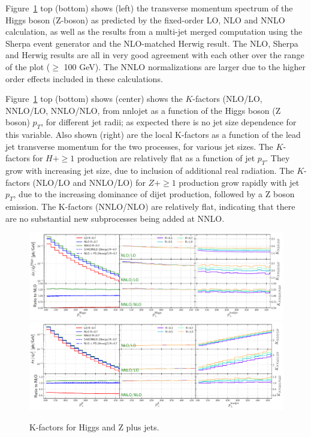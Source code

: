\documentclass[aps,prd,onecolumn,fleqn,superscriptaddress,groupedaddress,nofootinbib,preprintnumbers,nobalancelastpage]{revtex4}
\begin{document}
Figure~\ref{fig:K-factors} top (bottom) shows (left) the transverse momentum spectrum
of the Higgs boson (Z-boson)  as predicted by the fixed-order LO, NLO and NNLO calculation, as well as the
results from a multi-jet merged computation using the 
Sherpa event generator and
the NLO-matched 
Herwig result. The NLO, 
Sherpa and Herwig results are all in very good agreement with each other over the range of the plot ($\ge$ 100 GeV). The NNLO normalizations are larger due to the higher order effects included in these calculations. 

Figure~\ref{fig:K-factors} top (bottom) shows (center) shows the $K$-factors (NLO/LO, NNLO/LO, NNLO/NLO, from %
nnlojet as a function of the 
Higgs boson (Z boson) $p_T$, for different jet radii; as expected there is no jet size dependence for this
variable.  Also shown (right) are the local K-factors as a function of the lead jet transverse momentum for the two processes, for various jet sizes.  The
$K$-factors for $H+\ge1$ production  are relatively flat as a function of jet $p_T$.  They grow with
increasing jet size, due to inclusion of additional real radiation. The
$K$-factors (NLO/LO and NNLO/LO) for $Z+\ge1$ production  grow rapidly with  jet $p_T$, due to the increasing dominance of dijet production, followed by a Z boson emission. 
The K-factors (NNLO/NLO) are relatively flat, indicating that there are no substantial new subprocesses being added at NNLO. 

\begin{figure}
\includegraphics[width=\textwidth]{plots/Fig_V_14_Higgs_2.pdf}
\includegraphics[width=\textwidth]{plots/Fig_V_14_Z_2.pdf}
\caption{K-factors for Higgs and Z plus jets.}
\label{fig:K-factors}
\end{figure}
\end{document}
